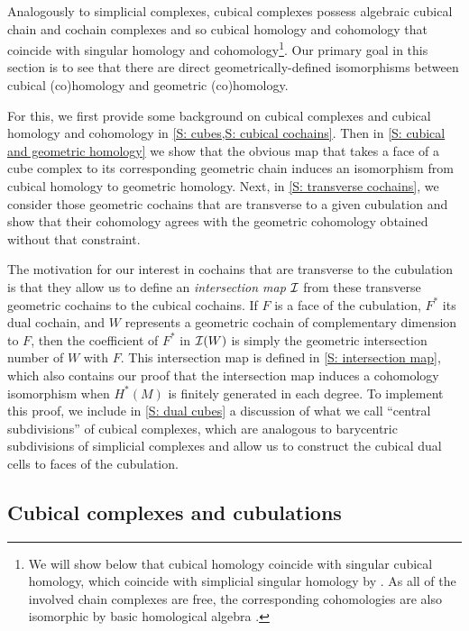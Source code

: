 Analogously to simplicial complexes, cubical complexes possess algebraic cubical chain and cochain complexes and so cubical homology and cohomology that coincide with singular homology and cohomology\footnote{We will show below that cubical homology coincide with singular cubical homology, which coincide with simplicial singular homology by \cite{EM53}.
As all of the involved chain complexes are free, the corresponding cohomologies are also isomorphic by basic homological algebra \cite[Theorem 45.5]{Mun84}.\label{FN: cubical and singular}}.
Our primary goal in this section is to see that there are direct geometrically-defined isomorphisms between cubical (co)homology and geometric (co)homology.

For this, we first provide some background on cubical complexes and cubical homology and cohomology in \cref{S: cubes,S: cubical cochains}.
Then in \cref{S: cubical and geometric homology} we show that the obvious map that takes a face of a cube complex to its corresponding geometric chain induces an isomorphism from cubical homology to geometric homology.
Next, in \cref{S: transverse cochains}, we consider those geometric cochains that are transverse to a given cubulation and show that their cohomology agrees with the geometric cohomology obtained without that constraint.

The motivation for our interest in cochains that are transverse to the cubulation is that they allow us to define an \textit{intersection map} $\mathcal{I}$ from these transverse geometric cochains to the cubical cochains.
If $F$ is a face of the cubulation, $F^*$ its dual cochain, and $W$ represents a geometric cochain of complementary dimension to $F$, then the coefficient of $F^*$ in $\mathcal{I}(W)$ is simply the geometric intersection number of $W$ with $F$.
This intersection map is defined in \cref{S: intersection map}, which also contains our proof that the intersection map induces a cohomology isomorphism when $H^*(M)$ is finitely generated in each degree.
To implement this proof, we include in \cref{S: dual cubes} a discussion of what we call ``central subdivisions'' of cubical complexes, which are analogous to barycentric subdivisions of simplicial complexes and allow us to construct the cubical dual cells to faces of the cubulation.

\subsection{Cubical complexes and cubulations}\label{S: cubes}

